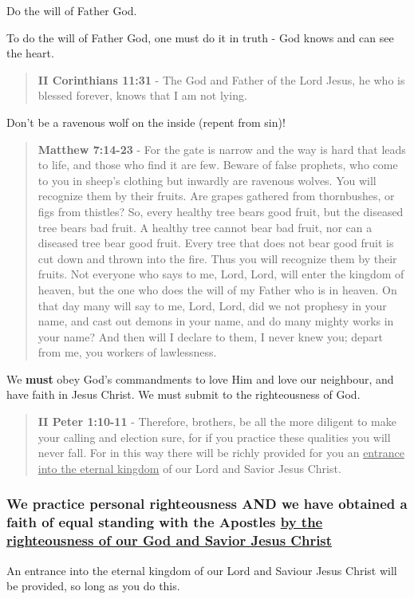 \documentclass[11pt]{article}
\begin{document}
Do the will of Father God.

To do the will of Father God, one must do it in truth - God knows and can see the heart.

\begin{quote}
\textbf{II Corinthians 11:31} - The God and Father of the Lord Jesus, he who is blessed forever, knows that I am not lying.
\end{quote}

Don't be a ravenous wolf on the inside (repent from sin)!

\begin{quote}
\textbf{Matthew 7:14-23} - For the gate is narrow and the way is hard that leads to life, and those who find it are few.  Beware of false prophets, who come to you in sheep's clothing but inwardly are ravenous wolves.  You will recognize them by their fruits. Are grapes gathered from thornbushes, or figs from thistles?  So, every healthy tree bears good fruit, but the diseased tree bears bad fruit.  A healthy tree cannot bear bad fruit, nor can a diseased tree bear good fruit.  Every tree that does not bear good fruit is cut down and thrown into the fire.  Thus you will recognize them by their fruits.  Not everyone who says to me, Lord, Lord, will enter the kingdom of heaven, but the one who does the will of my Father who is in heaven.  On that day many will say to me, Lord, Lord, did we not prophesy in your name, and cast out demons in your name, and do many mighty works in your name?  And then will I declare to them, I never knew you; depart from me, you workers of lawlessness.
\end{quote}

We \textbf{must} obey God's commandments to love Him and love our neighbour, and have faith in Jesus Christ.
We must submit to the righteousness of God.

\begin{quote}
\textbf{II Peter 1:10-11} - Therefore, brothers, be all the more diligent to make your calling and election sure, for if you practice these qualities you will never fall. For in this way there will be richly provided for you an \uline{entrance into the eternal kingdom} of our Lord and Savior Jesus Christ.
\end{quote}

\subsubsection{We practice personal righteousness AND we have obtained a faith of equal standing with the Apostles \underline{by the righteousness of our God and Savior Jesus Christ}}
\label{sec:org1216bd3}
An entrance into the eternal kingdom of our Lord and Saviour Jesus Christ will
be provided, so long as you do this.
\end{document}

